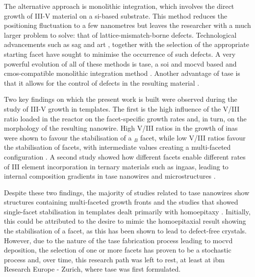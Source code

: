 The alternative approach is monolithic integration, which involves the direct growth of III-V material on a \acl{si}-based substrate. This method reduces the positioning fluctuation to a few nanometres but leaves the researcher with a much larger problem to solve: that of lattice-mismatch-borne defects. Technological advancements such as \acf{sag} and \acf{art} \cite{Kunert2016, Fiorenza2019}, together with the selection of the appropriate starting facet \cite{Kunert2018} have sought to minimise the occurrence of such defects. A very powerful evolution of all of these methods is \acf{tase}, a \acf{soi} and \acf{mocvd} based and \acs{cmos}-compatible \cite{Svensson2023} monolithic integration method \cite{borgTASEp2018, Schmid2015}. Another advantage of \acs{tase} is that it allows for the control of defects in the resulting material \cite{Knoedler2017, Staudinger2018, Han2020}. 

Two key findings on which the present work is built were observed during the study of III-V growth in templates. The first is the high influence of the V/III ratio loaded in the reactor on the facet-specific growth rates and, in turn, on the morphology of the resulting nanowire. High V/III ratios in the growth of \acs{inas} were shown to favour the stabilisation of a \(_B\) facet, while low V/III ratios favour the stabilisation of  facets, with intermediate values creating a multi-faceted configuration \cite{Borg2015}. A second study showed how different facets enable different rates of III element incorporation in ternary materials such as \acs{ingaas}, leading to internal composition gradients in \acs{tase} nanowires and microstructures \cite{Borg2019}.

Despite these two findings, the majority of studies related to \acs{tase} nanowires show structures containing multi-faceted growth fronts \cite{Knoedler2017, Han2016, Yan2021, Scherrer2024, Xue2021, Wen2022} and the studies that showed single-facet stabilisation in templates dealt primarily with homoepitaxy \cite{Goswami2020, Brunelli2019}. Initially, this could be attributed to the desire to mimic the homoepitaxial result showing the stabilisation of a  facet, as this has been shown to lead to defect-free crystals. However, due to the nature of the \acs{tase} fabrication process leading to \acs{mocvd} deposition, the selection of one or more  facets has proven to be a stochastic process \cite{Knoedler2017} and, over time, this research path was left to rest, at least at \acs{ibm} Research Europe - Zurich, where \acs{tase} was first formulated.

